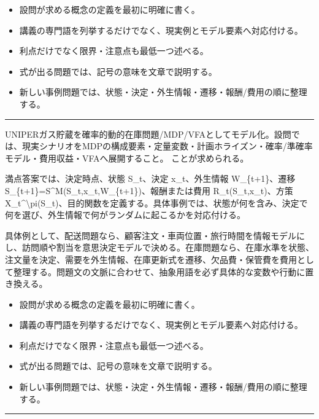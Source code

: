 \begin{itemize}
\item 設問が求める概念の定義を最初に明確に書く。
\item 講義の専門語を列挙するだけでなく、現実例とモデル要素へ対応付ける。
\item 利点だけでなく限界・注意点も最低一つ述べる。
\item 式が出る問題では、記号の意味を文章で説明する。
\item 新しい事例問題では、状態・決定・外生情報・遷移・報酬/費用の順に整理する。
\end{itemize}
\vspace{2mm}\hrule\vspace{2mm}
UNIPERガス貯蔵を確率的動的在庫問題/MDP/VFAとしてモデル化。設問では、現実シナリオをMDPの構成要素・定量変数・計画ホライズン・確率/準確率モデル・費用収益・VFAへ展開すること。 ことが求められる。\par
{}
満点答案では、決定時点、状態 S\_t、決定 x\_t、外生情報 W\_\{t+1\}、遷移 S\_\{t+1\}=S\textasciicircum{}M(S\_t,x\_t,W\_\{t+1\})、報酬または費用 R\_t(S\_t,x\_t)、方策 X\_t\textasciicircum{}\textbackslash{}pi(S\_t)、目的関数を定義する。具体事例では、状態が何を含み、決定で何を選び、外生情報で何がランダムに起こるかを対応付ける。\par
{}
具体例として、配送問題なら、顧客注文・車両位置・旅行時間を情報モデルにし、訪問順や割当を意思決定モデルで決める。在庫問題なら、在庫水準を状態、注文量を決定、需要を外生情報、在庫更新式を遷移、欠品費・保管費を費用として整理する。問題文の文脈に合わせて、抽象用語を必ず具体的な変数や行動に置き換える。\par
{}
\begin{itemize}
\item 設問が求める概念の定義を最初に明確に書く。
\item 講義の専門語を列挙するだけでなく、現実例とモデル要素へ対応付ける。
\item 利点だけでなく限界・注意点も最低一つ述べる。
\item 式が出る問題では、記号の意味を文章で説明する。
\item 新しい事例問題では、状態・決定・外生情報・遷移・報酬/費用の順に整理する。
\end{itemize}
\vspace{2mm}\hrule\vspace{2mm}
